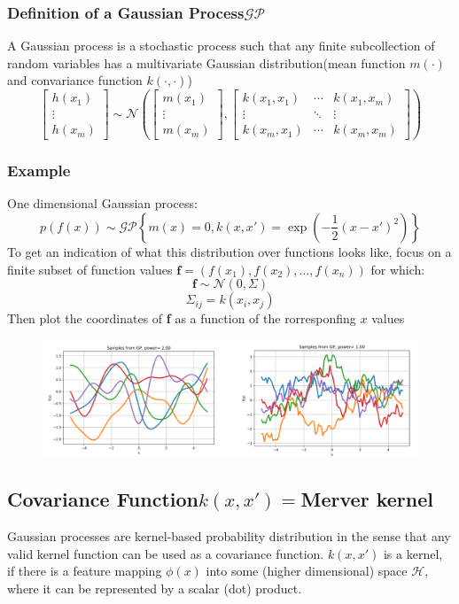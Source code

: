 \subsubsection{Definition of a Gaussian Process\(\mathcal{GP}\)}
A Gaussian process is a stochastic process such that any finite subcollection of random variables has a multivariate Gaussian distribution(mean function \(m(\cdot)\) and convariance function \(k(\cdot,\cdot)\))
\[
\begin{bmatrix}
h(x_1) \\
\vdots \\
h(x_m)
\end{bmatrix}
\sim \mathcal{N} \left(
\begin{bmatrix}
m(x_1) \\
\vdots \\
m(x_m)
\end{bmatrix},
\begin{bmatrix}
k(x_1, x_1) & \cdots & k(x_1, x_m) \\
\vdots & \ddots & \vdots \\
k(x_m, x_1) & \cdots & k(x_m, x_m)
\end{bmatrix}
\right)
\]
 
\subsubsection{Example}
One dimensional Gaussian process:
\[
p(f(x))\sim \mathcal{GP}\left\{m(x) = 0,k(x,x') = \exp\left(-\frac{1}{2}(x-x')^2\right)\right\}
\]
To get an indication of what this distribution over functions looks like, focus on a finite subset of function values \(\textbf{f} = (f(x_1),f(x_2),\dots,f(x_n))\) for which:
\[
    \textbf{f} \sim \mathcal{N}(0,\Sigma)
\]
\[
\Sigma_{ij} = k(x_i,x_j)
\]
Then plot the coordinates of \textbf{f} as a function of the rorresponfing \(x\) values
\begin{figure}[!h]
    \includegraphics[width = \columnwidth]{figures/09/GPExample.png}
\end{figure}
\subsection{Covariance Function\(k(x,x') = \)Merver kernel}
Gaussian processes are kernel-based probability distribution in the sense that any valid kernel function can be used as a covariance function.
\(k(x,x')\) is a kernel, if there is a feature mapping \(\phi(x)\) into some (higher dimensional) space \(\mathcal{H}\), where it can be represented by a scalar (dot) product.

